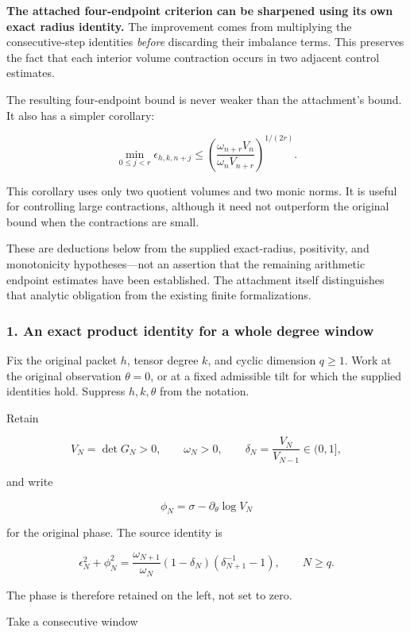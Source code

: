 \textbf{The attached four-endpoint criterion can be sharpened using its own exact radius identity.} The improvement comes from multiplying the consecutive-step identities \emph{before} discarding their imbalance terms. This preserves the fact that each interior volume contraction occurs in two adjacent control estimates.

The resulting four-endpoint bound is never weaker than the attachment's bound. It also has a simpler corollary:

\[
\boxed{
\min_{0\le j<r}\epsilon_{h,k,n+j}
\le
\left(
\frac{\omega_{n+r}V_n}
{\omega_nV_{n+r}}
\right)^{1/(2r)}.
}
\tag{1}
\]

This corollary uses only two quotient volumes and two monic norms. It is useful for controlling large contractions, although it need not outperform the original bound when the contractions are small.

These are deductions below from the supplied exact-radius, positivity, and monotonicity hypotheses---not an assertion that the remaining arithmetic endpoint estimates have been established. The attachment itself distinguishes that analytic obligation from the existing finite formalizations.

\subsubsection{1. An exact product identity for a whole degree window}\label{endpoint-user_product_original--an-exact-product-identity-for-a-whole-degree-window}

Fix the original packet \(h\), tensor degree \(k\), and cyclic dimension \(q\ge1\). Work at the original observation \(\theta=0\), or at a fixed admissible tilt for which the supplied identities hold. Suppress \(h,k,\theta\) from the notation.

Retain

\[
V_N=\det G_N>0,\qquad
\omega_N>0,\qquad
\delta_N=\frac{V_N}{V_{N-1}}\in(0,1],
\]

and write

\[
\phi_N=\sigma-\partial_\theta\log V_N
\]

for the original phase. The source identity is

\[
\boxed{
\epsilon_N^2+\phi_N^2
=
\frac{\omega_{N+1}}{\omega_N}
(1-\delta_N)(\delta_{N+1}^{-1}-1),
\qquad N\ge q.
}
\tag{2}
\]

The phase is therefore retained on the left, not set to zero.

Take a consecutive window

